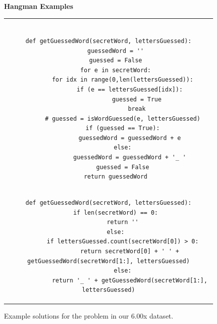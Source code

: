 \begin{figure}
{\bf Hangman Examples} \\
\begin{tabular}{c}
\begin{minipage}{1.0\linewidth}
\begin{lstlisting}[]

def getGuessedWord(secretWord, lettersGuessed):
    guessedWord = ''
    guessed = False
    for e in secretWord:
        for idx in range(0,len(lettersGuessed)):
            if (e == lettersGuessed[idx]):
                guessed = True
                break
        # guessed = isWordGuessed(e, lettersGuessed)
        if (guessed == True):
            guessedWord = guessedWord + e
        else:
            guessedWord = guessedWord + '_ '
        guessed = False
    return guessedWord
\end{lstlisting}
\end{minipage}
\\
\begin{minipage}{1.0\linewidth}
\begin{lstlisting}[]
def getGuessedWord(secretWord, lettersGuessed):
    if len(secretWord) == 0:
        return ''
    else:
        if lettersGuessed.count(secretWord[0]) > 0:
            return secretWord[0] + ' ' + getGuessedWord(secretWord[1:], lettersGuessed)
        else:
            return '_ ' + getGuessedWord(secretWord[1:], lettersGuessed)
\end{lstlisting}
\end{minipage}
\end{tabular}
\caption{Example solutions for the  problem in our 6.00x dataset.}
\label{hmexamples}
\end{figure}
